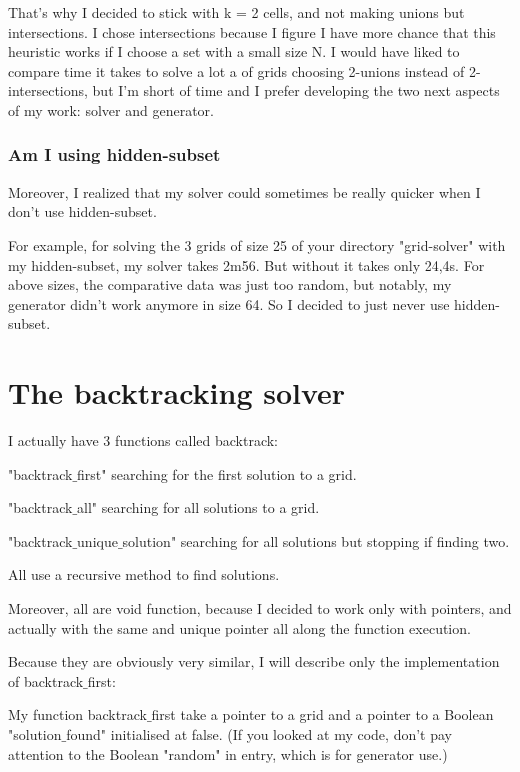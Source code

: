 \documentclass{article}
\begin{document}
\vspace{1\baselineskip}
That's why I decided to stick with k = 2 cells, and not making unions but intersections. I chose intersections because I figure I have more chance that this heuristic works if I choose a set with a small size N. I would have liked to compare time it takes to solve a lot a of grids choosing 2-unions instead of 2-intersections, but I'm short of time and I prefer developing the two next aspects of my work: solver and generator. 

\subsubsection{Am I using hidden-subset}

\vspace{1\baselineskip}
Moreover, I realized that my solver could sometimes be really quicker when I don't use hidden-subset.

For example, for solving the 3 grids of size 25 of your directory "grid-solver" with my hidden-subset, my solver takes 2m56. But without it takes only 24,4s. For above sizes, the comparative data was just too random, but notably, my generator didn't work anymore in size 64. So I decided to just never use hidden-subset.

\section{The backtracking solver}

I actually have 3 functions called backtrack: 

"backtrack$\_$first" searching for the first solution to a grid.

"backtrack$\_$all" searching for all solutions to a grid.

"backtrack$\_$unique$\_$solution" searching for all solutions but stopping if finding two.

\vspace{1\baselineskip}
All use a recursive method to find solutions.

Moreover, all are void function, because I decided to work only with pointers, and actually with the same and unique pointer all along the function execution.

\vspace{1\baselineskip}
Because they are obviously very similar, I will describe only the implementation of backtrack$\_$first:

\vspace{1\baselineskip}
My function backtrack$\_$first take a pointer to a grid and a pointer to a Boolean "solution$\_$found" initialised at false. (If you looked at my code, don't pay attention to the Boolean "random" in entry, which is for generator use.)
\end{document}
